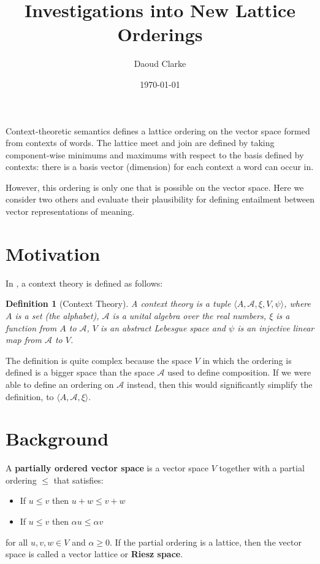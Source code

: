 \documentclass{article}
\author{Daoud Clarke}
\date{\today}
\title{Investigations into New Lattice Orderings}
\newtheorem{definition}{Definition}
\begin{document}
\maketitle

Context-theoretic semantics \citep{Clarke:07} defines a lattice
ordering on the vector space formed from contexts of words. The
lattice meet and join are defined by taking component-wise minimums
and maximums with respect to the basis defined by contexts: there is a
basis vector (dimension) for each context a word can occur in.

However, this ordering is only one that is possible on the vector
space. Here we consider two others and evaluate their plausibility for
defining entailment between vector representations of meaning.

\section{Motivation}

In \citep{Clarke:12}, a context theory is defined as follows:
\begin{definition}[Context Theory]
A context theory is a tuple $\langle A, \mathcal{A}, \xi, V, \psi
\rangle$, where $A$ is a set (the alphabet), $\mathcal{A}$ is a unital
algebra over the real numbers, $\xi$ is a function from $A$ to
$\mathcal{A}$, $V$ is an abstract Lebesgue space and $\psi$ is an
injective linear map from $\mathcal{A}$ to $V$.
\end{definition}

The definition is quite complex because the space $V$ in which the
ordering is defined is a bigger space than the space $\mathcal{A}$
used to define composition. If we were able to define an ordering on
$\mathcal{A}$ instead, then this would significantly simplify the
definition, to $\langle A, \mathcal{A}, \xi\rangle$.

\section{Background}

A \textbf{partially ordered vector space} is a vector space $V$
together with a partial ordering $\le$ that satisfies:
\begin{itemize}
\item If $u \le v$ then $u + w \le v + w$
\item If $u \le v$ then $\alpha u \le \alpha v$
\end{itemize}
for all $u,v,w \in V$ and $\alpha \ge 0$. If the partial ordering is a
lattice, then the vector space is called a vector lattice or
\textbf{Riesz space}.
\end{document}
